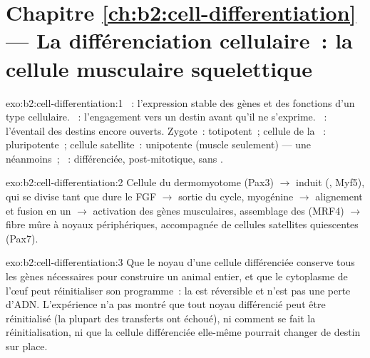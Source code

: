 \section*{Chapitre \ref{ch:b2:cell-differentiation} --- La différenciation cellulaire~: la cellule musculaire squelettique}

\begin{solution}{exo:b2:cell-differentiation:1}
~: l'expression stable des gènes et des fonctions d'un
type cellulaire. ~: l'engagement vers un destin avant qu'il
ne s'exprime. ~: l'éventail des destins encore ouverts.
Zygote~: totipotent~; cellule de la ~:
pluripotente~; cellule satellite~: unipotente (muscle seulement) --- une
 néanmoins~; ~: différenciée,
post-mitotique, sans .
\end{solution}

\begin{solution}{exo:b2:cell-differentiation:2}
Cellule du dermomyotome (Pax3) $\to$  induit (, Myf5), qui
se divise tant que dure le FGF $\to$ sortie du cycle, myogénine $\to$
alignement et fusion en un  $\to$ activation des gènes
musculaires, assemblage des  (MRF4) $\to$ fibre mûre à noyaux
périphériques, accompagnée de cellules satellites quiescentes (Pax7).
\end{solution}

\begin{solution}{exo:b2:cell-differentiation:3}
Que le noyau d'une cellule différenciée conserve tous les gènes
nécessaires pour construire un animal entier, et que le cytoplasme de
l'œuf peut réinitialiser son programme~: la  est
réversible et n'est pas une perte d'ADN. L'expérience n'a pas montré que
tout noyau différencié peut être réinitialisé (la plupart des transferts
ont échoué), ni comment se fait la réinitialisation, ni que la cellule
différenciée elle-même pourrait changer de destin sur place.
\end{solution}

